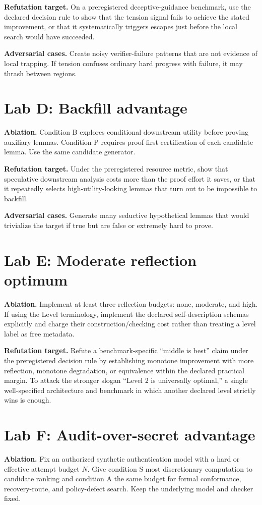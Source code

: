 \documentclass[11pt,openany]{book}
\theoremstyle{definition}
\theoremstyle{remark}
\begin{document}
\textbf{Refutation target.} On a preregistered deceptive-guidance benchmark, use the declared decision rule to show that the tension signal fails to achieve the stated improvement, or that it systematically triggers escapes just before the local search would have succeeded.

\textbf{Adversarial cases.} Create noisy verifier-failure patterns that are not evidence of local trapping. If tension confuses ordinary hard progress with failure, it may thrash between regions.

\section{Lab D: Backfill advantage}
\textbf{Ablation.} Condition B explores conditional downstream utility before proving auxiliary lemmas. Condition P requires proof-first certification of each candidate lemma. Use the same candidate generator.

\textbf{Refutation target.} Under the preregistered resource metric, show that speculative downstream analysis costs more than the proof effort it saves, or that it repeatedly selects high-utility-looking lemmas that turn out to be impossible to backfill.

\textbf{Adversarial cases.} Generate many seductive hypothetical lemmas that would trivialize the target if true but are false or extremely hard to prove.

\section{Lab E: Moderate reflection optimum}
\textbf{Ablation.} Implement at least three reflection budgets: none, moderate, and high. If using the Level terminology, implement the declared self-description schemas explicitly and charge their construction/checking cost rather than treating a level label as free metadata.

\textbf{Refutation target.} Refute a benchmark-specific ``middle is best'' claim under the preregistered decision rule by establishing monotone improvement with more reflection, monotone degradation, or equivalence within the declared practical margin. To attack the stronger slogan ``Level 2 is universally optimal,'' a single well-specified architecture and benchmark in which another declared level strictly wins is enough.



\section{Lab F: Audit-over-secret advantage}
\textbf{Ablation.} Fix an authorized synthetic authentication model with a hard or effective attempt budget $N$. Give condition S most discretionary computation to candidate ranking and condition A the same budget for formal conformance, recovery-route, and policy-defect search. Keep the underlying model and checker fixed.
\end{document}
